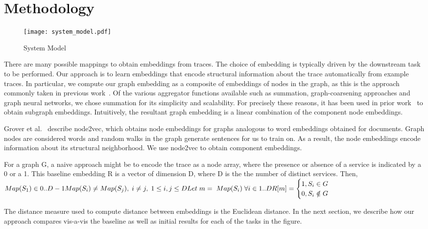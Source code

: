 \section{Methodology}
\begin{figure}[h]
\begin{center}
\texttt{[image: system\_model.pdf]}
\caption{System Model} 
\label{System_model}
\end{center}
\end{figure}

There are many possible mappings to obtain embeddings from traces. The choice of embedding is typically driven by the downstream task to be performed. Our approach is to learn embeddings that encode structural information about the trace automatically from example traces. In particular, we compute our graph embedding as a composite of embeddings of nodes in the graph, as this is the approach commonly taken in previous work~\cite{corr_2017_abs-1709-05584}. Of the various aggregator functions available such as summation, graph-coarsening approaches and graph neural networks, we chose summation for its simplicity and scalability. For precisely these reasons, it has been used in prior work~\cite{DBLP:journals/corr/DuvenaudMAGHAA15, DBLP:journals/corr/DaiDS16} to obtain subgraph embeddings. Intuitively, the resultant graph embedding is a linear combination of the component node embeddings. 

Grover et al.~\cite{corr18_GroverL16} describe node2vec, which obtains node embeddings for graphs analogous to word embeddings obtained for documents. Graph nodes are considered words and random walks in the graph generate sentences for us to train on. As a result, the node embeddings encode information about its structural neighborhood. We use node2vec to obtain component embeddings.  

For a graph G, a naive approach might be to encode the trace as a node array, where the presence or absence of a service is indicated by a 0 or a 1. This baseline embedding R is a vector of dimension D, where D is the the number of distinct services. Then, \newline
\begin{math}
Map(S_{1}) \in {0..D-1} \\
Map(S_{i}) \neq Map(S_{j}),\;  i \neq j,\; 1 \leq i,j \leq D \\
    Let\; m =\; Map(S_{i})\; \forall i \in {1..D} \\
    R[m] = 
    \begin{cases}
        1, S_{i} \in G \\
        0, S_{i} \notin G \\
    \end{cases}
\end{math}

The distance measure used to compute distance between embeddings is the Euclidean distance. In the next section, we describe how our approach compares vis-a-vis the baseline as well as initial results for each of the tasks in the figure.
